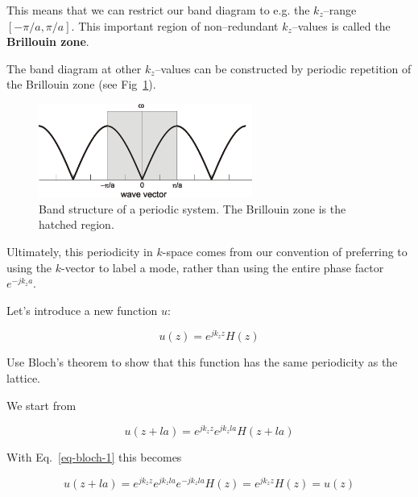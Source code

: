 This means that we can restrict our band diagram to e.g. the $k_z$--range $[-\pi/a,\pi/a]$. This important region of non--redundant $k_z$--values is called the \textbf{Brillouin zone}.

The band diagram at other $k_z$--values can be constructed by periodic repetition of the Brillouin zone (see Fig~\ref{fig-band-folding}).

\begin{figure}[H]
\centering
\includegraphics[width=7cm]{symmetry/figures/band_folding}
\caption{Band structure of a periodic system. The Brillouin zone is the hatched region.}
\label{fig-band-folding}
\end{figure}

Ultimately, this periodicity in $k$-space comes from our convention of preferring to using the $k$-vector to label a mode, rather than using the entire phase factor $ e^{-j k_z a}$. 

\pagebreak

\label{week9}

Let's introduce a new function $u$:

\begin{equation}
u(z) = e^{j k_z z} H(z) \label{eq-bloch-u}
\end{equation} 

\begin{cue}
Use Bloch's theorem to show that this function has the same periodicity as the lattice.
\end{cue}

\noindent{}We start from

\begin{equation}
u(z+la)= e^{j k_z z} e^{j k_z l a} H(z + l a)
\end{equation} 

With Eq.~\ref{eq-bloch-1} this becomes

\begin{equation}
u(z+l a)= e^{j k_z z} e^{j k_z l a} e^{-j k_z l a} H(z) = e^{j k_z z} H(z) = u(z)
\end{equation} 

